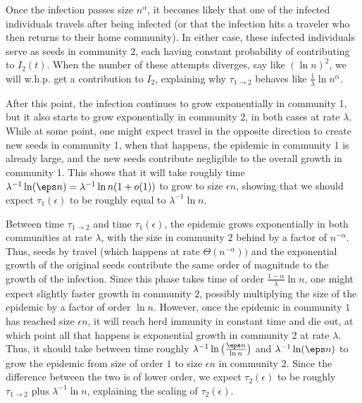 \documentclass[11pt]{article}
\begin{document}
Once the infection passes size $n^{\alpha}$, it becomes likely that one of the infected individuals travels after being infected (or that the infection hits a traveler who then returns to their home community).  In either case, these infected individuals serve as seeds in 
community 2, each having constant probability of contributing to $I_2(t)$.  When the number of these attempts diverges, say like $(\ln n)^2$, we will w.h.p. get a contribution to $I_2$, explaining why $\tau_{1\to 2}$ behaves like $\frac 1\lambda \ln n^\alpha$.  

After this point, the infection continues to grow exponentially in community 1, but it also starts to grow exponentially in community 2, in both cases at rate $\lambda$.  While at some point, one might expect travel in the opposite direction to create new seeds in community 1, when that happens, the epidemic in community 1 is already large, and the new seeds contribute negligible to the overall growth in community 1. This shows that it will take roughly time $\lambda^{-1}\ln (\eps n)=\lambda^{-1} \ln n (1+o(1))$ to grow to size $\epsilon n$, showing that we should expect $\tau_1(\epsilon)$
to be roughly equal to $\lambda^{-1} \ln n$.

Between time $\tau_{1\to 2}$ and time $\tau_1(\epsilon)$, the epidemic grows exponentially in both communities at rate $\lambda$, with the size in community $2$ behind by a factor of $n^{-\alpha}$.  Thus, seeds by travel (which happens at rate $\Theta(n^{-\alpha}))$ and the exponential growth of the original seeds contribute the same order of magnitude to the growth of the infection. Since this phase takes time of order $\frac {1-\alpha}\lambda\ln n$, one might expect slightly faster growth in community $2$, possibly multiplying the size of the epidemic by a factor of order $\ln n$.  However, once the epidemic in community $1$ has reached size $\epsilon n$, it will reach herd immunity in constant time and die out, at which point all that happens is exponential growth in community 2 at rate $\lambda$.  Thus, it should take between time roughly 
$\lambda^{-1} \ln \big(\frac {\eps n}{\ln n}\big)$ and 
$\lambda^{-1} \ln (\eps n)$ to grow the epidemic from size of order $1$ to size $\epsilon n$ in community 2. Since the difference between the two is of lower order, we expect $\tau_2(\epsilon)$ to be roughly  $\tau_{1\to 2}$ plus $\lambda^{-1}\ln n$, explaining the scaling of $\tau_2(\epsilon)$.
\end{document}
